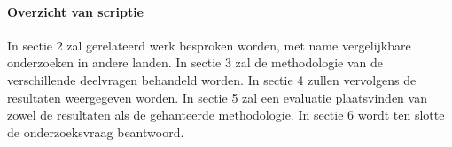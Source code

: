 \paragraph{Overzicht van scriptie}
In sectie 2 zal gerelateerd werk besproken worden, met name vergelijkbare onderzoeken in andere landen. In sectie 3 zal de methodologie van de verschillende deelvragen behandeld worden. In sectie 4 zullen vervolgens de resultaten weergegeven worden. In sectie 5 zal een evaluatie plaatsvinden van zowel de resultaten als de gehanteerde methodologie. In sectie 6 wordt ten slotte de onderzoeksvraag beantwoord.
